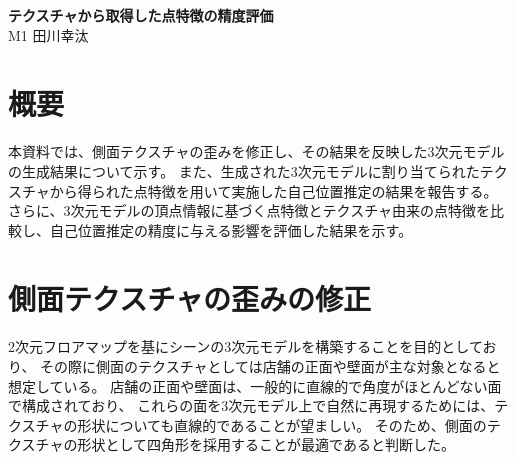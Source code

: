 \documentclass[]{jarticle}          %
\begin{document}

\vspace*{2ex}
\begin{center}
 {\Large \bf テクスチャから取得した点特徴の精度評価}\\ %
 \vspace*{5mm}
 {\large M1 田川幸汰}%
\end{center}





\section{概要}
本資料では、側面テクスチャの歪みを修正し、その結果を反映した3次元モデルの生成結果について示す。
また、生成された3次元モデルに割り当てられたテクスチャから得られた点特徴を用いて実施した自己位置推定の結果を報告する。
さらに、3次元モデルの頂点情報に基づく点特徴とテクスチャ由来の点特徴を比較し、自己位置推定の精度に与える影響を評価した結果を示す。

\section{側面テクスチャの歪みの修正}
2次元フロアマップを基にシーンの3次元モデルを構築することを目的としており、
その際に側面のテクスチャとしては店舗の正面や壁面が主な対象となると想定している。
店舗の正面や壁面は、一般的に直線的で角度がほとんどない面で構成されており、
これらの面を3次元モデル上で自然に再現するためには、テクスチャの形状についても直線的であることが望ましい。
そのため、側面のテクスチャの形状として四角形を採用することが最適であると判断した。
\end{document}
